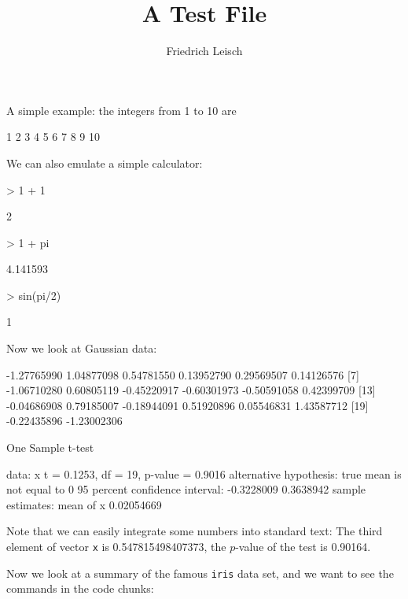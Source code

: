 \documentclass[a4paper]{article}
\title{A Test File}
\author{Friedrich Leisch}
\begin{document}
\maketitle

A simple example: the integers from 1 to 10 are
\begin{Schunk}
\begin{Soutput}
 [1]  1  2  3  4  5  6  7  8  9 10
\end{Soutput}
\end{Schunk}

We can also emulate a simple calculator:
\begin{Schunk}
\begin{Sinput}
> 1 + 1
\end{Sinput}
\begin{Soutput}
[1] 2
\end{Soutput}
\begin{Sinput}
> 1 + pi
\end{Sinput}
\begin{Soutput}
[1] 4.141593
\end{Soutput}
\begin{Sinput}
> sin(pi/2)
\end{Sinput}
\begin{Soutput}
[1] 1
\end{Soutput}
\end{Schunk}

Now we look at Gaussian data:

\begin{Schunk}
\begin{Soutput}
 [1] -1.27765990  1.04877098  0.54781550  0.13952790  0.29569507  0.14126576
 [7] -1.06710280  0.60805119 -0.45220917 -0.60301973 -0.50591058  0.42399709
[13] -0.04686908  0.79185007 -0.18944091  0.51920896  0.05546831  1.43587712
[19] -0.22435896 -1.23002306
\end{Soutput}
\begin{Soutput}
	One Sample t-test

data:  x
t = 0.1253, df = 19, p-value = 0.9016
alternative hypothesis: true mean is not equal to 0
95 percent confidence interval:
 -0.3228009  0.3638942
sample estimates:
 mean of x 
0.02054669 
\end{Soutput}
\end{Schunk}
Note that we can easily integrate some numbers into standard text: The
third element of vector \texttt{x} is 0.547815498407373, the
$p$-value of the test is 0.90164. %

Now we look at a summary of the famous \texttt{iris} data set, and we
want to see the commands in the code chunks:
\end{document}
